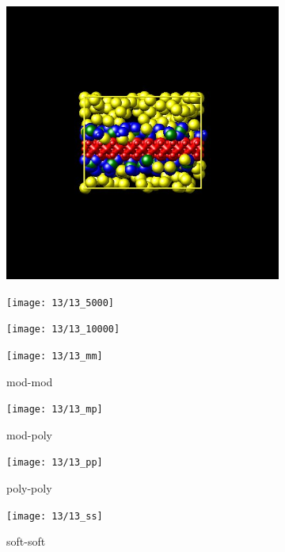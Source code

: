 \documentclass[a4paper]{article}
\begin{document}
\begin{figure}[H]
\begin{subfigure}{0.3\textwidth}
  \centering
  \includegraphics[width=\linewidth,keepaspectratio]{start}
  \caption{}
\end{subfigure}
\begin{subfigure}{0.3\textwidth}
  \centering
  \texttt{[image: 13/13\_5000]}
  \caption{}
\end{subfigure}
\begin{subfigure}{0.3\textwidth}
  \centering
  \texttt{[image: 13/13\_10000]}
  \caption{}
\end{subfigure}
\caption{}
\label{fig_1}
\end{figure}

\begin{figure}[H]
\begin{subfigure}{0.24\textwidth}
  \centering
  \texttt{[image: 13/13\_mm]}
  \caption{mod-mod}
\end{subfigure}
\begin{subfigure}{0.24\textwidth}
  \centering
  \texttt{[image: 13/13\_mp]}
  \caption{mod-poly}
\end{subfigure}
\begin{subfigure}{0.24\textwidth}
  \centering
  \texttt{[image: 13/13\_pp]}
  \caption{poly-poly}
\end{subfigure}
\begin{subfigure}{0.24\textwidth}
  \centering
  \texttt{[image: 13/13\_ss]}
  \caption{soft-soft}
\end{subfigure}
\caption{}
\label{fig_1}
\end{figure}
\end{document}
